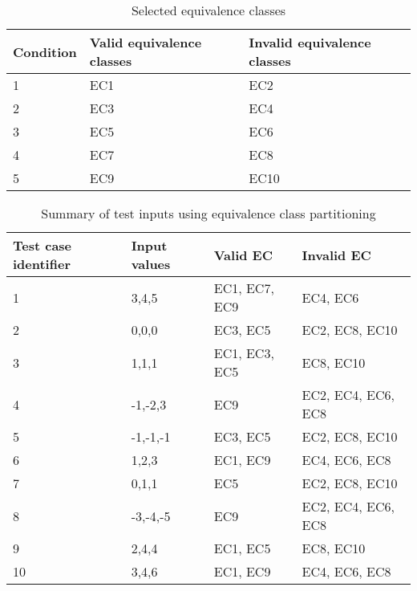 \begin{table}[!htb]
	\centering
	\label{classestable}
	\caption{Selected equivalence classes}
    \begin{tabular}{|l|l|l|}
        \hline
        Condition  & Valid equivalence classes & Invalid equivalence classes \\ \hline
        1          & EC1                       & EC2                         \\ 
        2          & EC3                       & EC4                         \\ 
        3          & EC5                       & EC6                         \\ 
        4          & EC7                       & EC8                         \\ 
        5          & EC9                       & EC10                        \\
        \hline
    \end{tabular}
\end{table}

\begin{table}[!htb]
	\label{testinputtable}
	\caption{Summary of test inputs using equivalence class partitioning}
    \begin{tabular}{|l|l|l|l|}
        \hline
        Test case identifier & Input values & Valid EC      & Invalid EC         \\ \hline
        1                    & 3,4,5        & EC1, EC7, EC9 & EC4, EC6           \\ 
        2                    & 0,0,0        & EC3, EC5      & EC2, EC8, EC10     \\ 
        3                    & 1,1,1        & EC1, EC3, EC5 & EC8, EC10          \\ 
        4                    & -1,-2,3      & EC9           & EC2, EC4, EC6, EC8 \\ 
        5                    & -1,-1,-1     & EC3, EC5      & EC2, EC8, EC10     \\ 
        6                    & 1,2,3        & EC1, EC9      & EC4, EC6, EC8      \\ 
        7                    & 0,1,1        & EC5           & EC2, EC8, EC10     \\ 
        8                    & -3,-4,-5     & EC9           & EC2, EC4, EC6, EC8 \\ 
        9                    & 2,4,4        & EC1, EC5      & EC8, EC10          \\ 
        10                   & 3,4,6        & EC1, EC9      & EC4, EC6, EC8      \\
        \hline
    \end{tabular}
\end{table}






